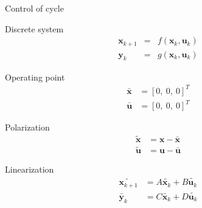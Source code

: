 \documentclass[10pt, xcolor={usenames, dvipsnames}]{beamer}
\begin{document}
        \begin{frame}{Control of cycle}
            \begin{minipage}{.48\textwidth}
                \begin{block}{Discrete system}
                    \begin{eqnarray}
                        \mathbf{x}_{k+1} &=& f(\mathbf{x}_k, \mathbf{u}_k)\\
                        \mathbf{y}_k &=& g(\mathbf{x}_k, \mathbf{u}_k)
                    \end{eqnarray}
                \end{block}
                \begin{block}{Operating point}
                    \begin{align}
                        \bar{\mathbf{x}} &= [0,\ 0,\ 0]^T\\
                        \bar{\mathbf{u}} &= [0,\ 0,\ 0]^T
                    \end{align}
                \end{block}
            \end{minipage}
            \hfill
            \begin{minipage}{.48\textwidth}
                \begin{block}{Polarization}
                    \begin{align}
                        \tilde{\mathbf{x}} &= \mathbf{x} - \bar{\mathbf{x}}\\
                        \tilde{\mathbf{u}} &= \mathbf{u} - \bar{\mathbf{u}}
                    \end{align}
                \end{block}
                \begin{block}{Linearization}
                    \begin{eqnarray}
                        \tilde{\mathbf{x}_{k+1}} &= A\tilde{\mathbf{x}_k} + B\tilde{\mathbf{u}_k}\\
                        \tilde{\mathbf{y}_k} &= C\tilde{\mathbf{x}_k} + D\tilde{\mathbf{u}_k}
                    \end{eqnarray}
                \end{block}
            
            \end{minipage}
        \end{frame}
\end{document}
